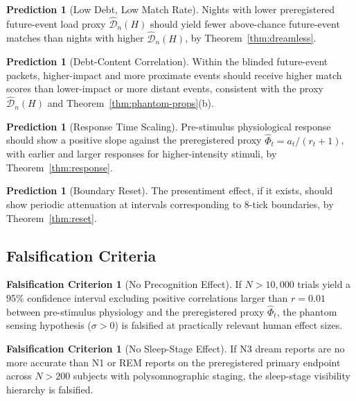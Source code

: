\documentclass[11pt, a4paper]{article}
\theoremstyle{definition}
\newtheorem{prediction}[theorem]{Prediction}
\newtheorem{falsifier}[theorem]{Falsification Criterion}
\theoremstyle{remark}
\begin{document}
\begin{prediction}[Low Debt, Low Match Rate]\label{pred:debt}
Nights with lower preregistered future-event load proxy
$\widehat{\mathcal{D}}_n(H)$ should yield fewer above-chance
future-event matches than nights with higher
$\widehat{\mathcal{D}}_n(H)$, by
Theorem~\ref{thm:dreamless}.
\end{prediction}

\begin{prediction}[Debt-Content Correlation]\label{pred:content}
Within the blinded future-event packets, higher-impact and more
proximate events should receive higher match scores than lower-impact
or more distant events, consistent with the proxy
$\widehat{\mathcal{D}}_n(H)$ and Theorem~\ref{thm:phantom-props}(b).
\end{prediction}

\begin{prediction}[Response Time Scaling]\label{pred:response}
Pre-stimulus physiological response should show a positive slope
against the preregistered proxy
$\widehat{\Phi}_t = a_t/(r_t + 1)$, with earlier and larger responses
for higher-intensity stimuli, by Theorem~\ref{thm:response}.
\end{prediction}

\begin{prediction}[Boundary Reset]\label{pred:reset}
The presentiment effect, if it exists, should show periodic
attenuation at intervals corresponding to 8-tick boundaries, by
Theorem~\ref{thm:reset}.
\end{prediction}

\subsection{Falsification Criteria}

\begin{falsifier}[No Precognition Effect]\label{fal:no-precog}
If $N > 10{,}000$ trials yield a 95\% confidence interval excluding
positive correlations larger than $r = 0.01$ between pre-stimulus
physiology and the preregistered proxy $\widehat{\Phi}_t$, the
phantom sensing hypothesis ($\sigma > 0$) is falsified at practically
relevant human effect sizes.
\end{falsifier}

\begin{falsifier}[No Sleep-Stage Effect]\label{fal:no-sleep}
If N3 dream reports are no more accurate than N1 or REM reports on
the preregistered primary endpoint across $N > 200$ subjects with
polysomnographic staging, the sleep-stage visibility hierarchy is
falsified.
\end{falsifier}
\end{document}
